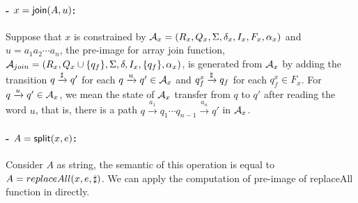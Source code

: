 {\paragraph{- $x = \mathsf{join}(A,u)$:} Suppose that $x$ is constrained by $\mathcal{A}_x=(R_x, Q_x, \Sigma, \delta_x, I_x, F_x, \alpha_x)$ and $u=a_1a_2\cdots a_n$, the pre-image for array join function, $\mathcal{A}_{join}=(R_x, Q_x\cup\{q_f\}, \Sigma, \delta, I_x, \{q_f\}, \alpha_x)$, is generated from $\mathcal{A}_x$ by adding the transition $q\xrightarrow{\sharp}q'$ for each $q\xrightarrow{u}q'\in\mathcal{A}_x$ and $q_f^x\xrightarrow{\sharp}q_f$ for each $q_f^x\in F_x$. For $q\xrightarrow{u}q'\in \mathcal{A}_x$, we mean the state of $\mathcal{A}_x$ transfer from $q$ to $q'$ after reading the word $u$, that is, there is a path $q\xrightarrow{a_1}q_1\cdots q_{n-1}\xrightarrow{a_n}q'$ in $\mathcal{A}_x$. 

\paragraph{- $A = \mathsf{split}(x, e)$:} Consider $A$ as string, the semantic of this operation is equal to $A = replaceAll(x, e, \sharp)$. We can apply the computation of pre-image of replaceAll function in \cite{ostrich} directly.
}
